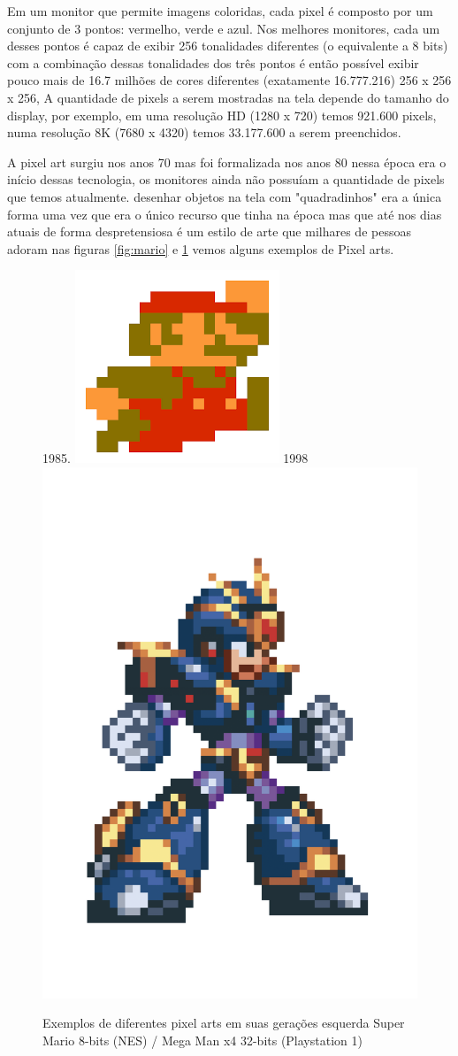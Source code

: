 Em um monitor que permite imagens coloridas, cada pixel é composto por um conjunto de 3 pontos: vermelho, verde e azul. Nos melhores monitores, cada um desses pontos é capaz de exibir 256 tonalidades diferentes (o equivalente a 8 bits) com  a combinação dessas tonalidades dos três pontos é então possível exibir pouco mais de 16.7 milhões de cores diferentes (exatamente 16.777.216)  256 x 256 x 256, A quantidade de pixels a serem mostradas na tela depende do tamanho do display, por exemplo, em uma resolução HD (1280 x 720) temos 921.600 pixels, numa resolução 8K (7680 x 4320) temos 33.177.600 a serem preenchidos.

A pixel art surgiu nos anos 70 mas foi formalizada nos anos 80 nessa época era o início dessas tecnologia, os monitores ainda não possuíam a quantidade de pixels que temos atualmente. desenhar objetos na tela com "quadradinhos" era a única forma uma vez que era o único recurso que tinha na época mas que até nos dias atuais de forma despretensiosa é um estilo de arte que milhares de pessoas adoram 
nas figuras \ref{fig:mario} e \ref{fig:mega_man} vemos alguns exemplos de Pixel arts.
\begin{figure}[ht!]
    \caption{Exemplos de diferentes pixel arts em suas gerações esquerda Super Mario 8-bits (NES) /  Mega Man x4 32-bits (Playstation 1)}
    \label{fig:comparative-8bit-32-bit-pixel-art}
    \subfloat\label{fig:mario}1985.{
        \includegraphics[width=0.35\linewidth]{figuras/mario-sprite-nes.png}
    }\hfill
    \subfloat\label{fig:mega_man}1998{
        \includegraphics[width=0.3\linewidth]{figuras/mega-man-ps1.png}
    }
\end{figure}

